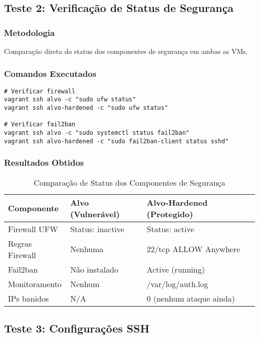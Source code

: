 \documentclass[12pt]{article}
\begin{document}
\subsection{Teste 2: Verificação de Status de Segurança}

\subsubsection{Metodologia}
Comparação direta do status dos componentes de segurança em ambas as VMs.

\subsubsection{Comandos Executados}
\begin{verbatim}
# Verificar firewall
vagrant ssh alvo -c "sudo ufw status"
vagrant ssh alvo-hardened -c "sudo ufw status"

# Verificar fail2ban
vagrant ssh alvo -c "sudo systemctl status fail2ban"
vagrant ssh alvo-hardened -c "sudo fail2ban-client status sshd"
\end{verbatim}

\subsubsection{Resultados Obtidos}

\begin{table}[h]
\centering
\begin{tabular}{|l|l|l|}
\hline
\textbf{Componente} & \textbf{Alvo (Vulnerável)} & \textbf{Alvo-Hardened (Protegido)} \\ \hline
Firewall UFW & Status: inactive & Status: active \\ \hline
Regras Firewall & Nenhuma & 22/tcp ALLOW Anywhere \\ \hline
Fail2ban & Não instalado & Active (running) \\ \hline
Monitoramento & Nenhum & /var/log/auth.log \\ \hline
IPs banidos & N/A & 0 (nenhum ataque ainda) \\ \hline
\end{tabular}
\caption{Comparação de Status dos Componentes de Segurança}
\end{table}

\subsection{Teste 3: Configurações SSH}
\end{document}
